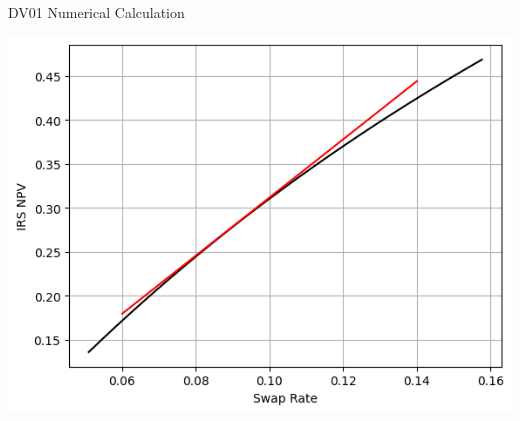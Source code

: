 \documentclass{beamer}
\begin{document}
\begin{frame}{DV01 Numerical Calculation}
	\begin{center}
		\includegraphics[width=0.6\linewidth]{dv01}
	\end{center}
\end{frame}


\end{document}
